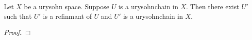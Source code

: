 \begin{proposition}\label{urysohnchain_induction_step_existence}
    Let $X$ be a urysohn space.
    Suppose $U$ is a urysohnchain in $X$.
    Then there exist $U'$ such that $U'$ is a refinmant of $U$ and $U'$ is a urysohnchain in $X$.
\end{proposition}
\begin{proof}
    
    
    
    


\end{proof}










%                     



